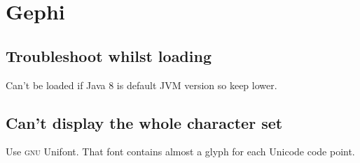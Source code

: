 \section{Gephi}

\subsection{Troubleshoot whilst loading}

Can't be loaded if Java 8 is default JVM version so keep lower.

\subsection{Can't display the whole character set}

Use \textsc{gnu} Unifont. That font contains almost a glyph for each Unicode code point.
